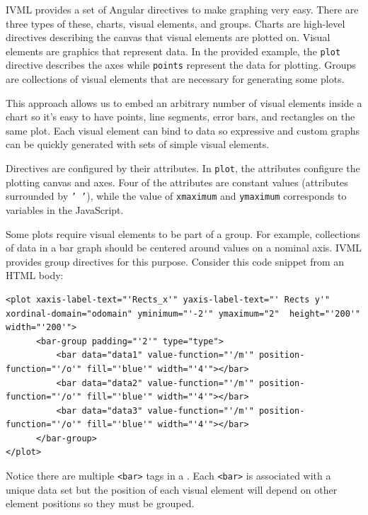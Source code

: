 \documentclass[a4paper,10pt-]{article}
\begin{document}
IVML provides a set of Angular directives to make graphing very easy. There are three types of these, charts, visual elements, and groups. Charts are high-level directives describing the canvas that visual elements are plotted on. Visual elements are graphics that represent data. In the provided example, the {\tt plot} directive describes the axes while {\tt points} represent the data for plotting. Groups are collections of visual elements that are necessary for generating some plots.

This approach allows us to embed an arbitrary number of visual elements inside a chart so it's easy to have points, line segments, error bars, and rectangles on the same plot. Each visual element can bind to data so expressive and custom graphs can be quickly generated with sets of simple visual elements.

Directives are configured by their attributes. In {\tt plot}, the attributes configure the plotting canvas and axes. Four of the attributes are constant values (attributes surrounded by {\tt ' '}), while the value of {\tt xmaximum} and {\tt ymaximum} corresponds to variables in the JavaScript. 

Some plots require visual elements to be part of a group. For example, collections of data in a bar graph should be centered around values on a nominal axis. IVML provides group directives for this purpose. Consider this code snippet from an HTML body:

\lstset{language=HTML,label=ivml}

\begin{lstlisting}
<plot xaxis-label-text="'Rects_x'" yaxis-label-text="' Rects y'"  xordinal-domain="odomain" yminimum="'-2'" ymaximum="2"  height="'200'" width="'200'">
      <bar-group padding="'2'" type="type">
          <bar data="data1" value-function="'/m'" position-function="'/o'" fill="'blue'" width="'4'"></bar>
          <bar data="data2" value-function="'/m'" position-function="'/o'" fill="'blue'" width="'4'"></bar>
          <bar data="data3" value-function="'/m'" position-function="'/o'" fill="'blue'" width="'4'"></bar>
      </bar-group>
</plot>

\end{lstlisting}

\noindent Notice there are multiple {\tt <bar>} tags in a {\tt <bar-group>}. Each {\tt <bar>} is associated with a unique data set but the position of each visual element will depend on other element positions so they must be grouped. 
\end{document}
